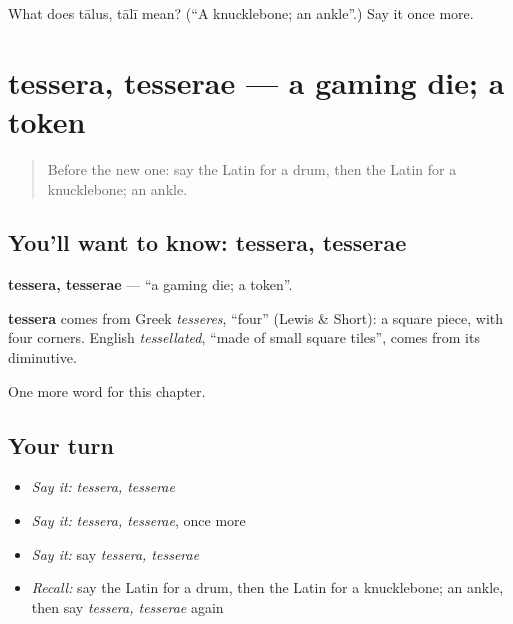 \begin{tcolorbox}[breakable,colback=teal!4,colframe=teal!35!black,title={Before you move on}]
What does tālus, tālī mean? (\textquotedblleft{}A knucklebone; an ankle\textquotedblright{}.) Say it once more.
\end{tcolorbox}
\section[tessera, tesserae]{tessera, tesserae — a gaming die; a token}

\label{lesson:LA-C193-tessera}



\begin{quote}
Before the new one: say the Latin for a drum, then the Latin for a knucklebone; an ankle.
\end{quote}

\subsection*{You'll want to know: tessera, tesserae}
\textbf{tessera, tesserae} — \textquotedblleft{}a gaming die; a token\textquotedblright{}.

\begin{cousinweb}
\textbf{tessera} comes from Greek \emph{tesseres}, \textquotedblleft{}four\textquotedblright{} (Lewis \& Short): a square piece, with four corners. English \emph{tessellated}, \textquotedblleft{}made of small square tiles\textquotedblright{}, comes from its diminutive.
\end{cousinweb}

\begin{grammarlens}[title={What you've built}]
One more word for this chapter.
\end{grammarlens}

\subsection*{Your turn}
\begin{itemize}
\raggedright
  \item \emph{Say it:} \emph{tessera, tesserae}
  \item \emph{Say it:} \emph{tessera, tesserae}, once more
  \item \emph{Say it:} say \emph{tessera, tesserae}
  \item \emph{Recall:} say the Latin for a drum, then the Latin for a knucklebone; an ankle, then say \emph{tessera, tesserae} again
\end{itemize}

